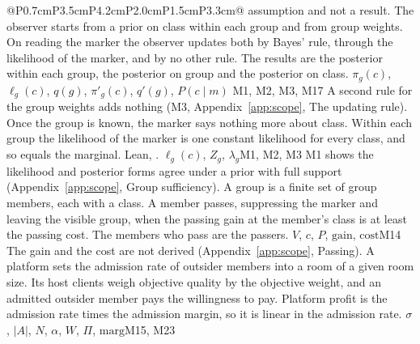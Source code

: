 \begin{longtable}{@{}P{0.7cm}P{3.5cm}P{4.2cm}P{2.0cm}P{1.5cm}P{3.3cm}@{}}
{  assumption and not a result.}
  {The observer starts from a prior on class within each group and from
  group weights. On reading the marker the observer updates both by Bayes'
  rule, through the likelihood of the marker, and by no other rule. The
  results are the posterior within each group, the posterior on group and
  the posterior on class.}
  {$\pi_g(c)$, $\ell_g(c)$, $q(g)$, $\pi'_g(c)$, $q'(g)$, $P(c\mid m)$}
  {M1, M2, M3, M17}
  {A second rule for the group weights adds nothing (M3,
  Appendix~\ref{app:scope}, The updating rule).}
  {Once the group is known, the marker says nothing more about class. Within
  each group the likelihood of the marker is one constant likelihood for
  every class, and so equals the marginal.
  Lean, .}
  {$\ell_g(c)$, $Z_g$, $\lambda_g$}{M1, M2, M3}
  {M1 shows the likelihood and posterior forms
  agree under a prior with full support (Appendix~\ref{app:scope}, Group
  sufficiency).}
  {A group is a finite set of group members, each with a class. A member
  passes, suppressing the marker and leaving the visible group, when the
  passing gain at the member's class is at least the passing cost. The
  members who pass are the passers.}
  {$V$, $c$, $P$, $\mathrm{gain}$, $\mathrm{cost}$}{M14}
  {The gain and the cost are not derived
  (Appendix~\ref{app:scope}, Passing).}
  {A platform sets the admission rate of outsider members into a room of a
  given room size. Its host clients weigh objective quality by the objective
  weight, and an admitted outsider member pays the willingness to pay.
  Platform profit is the admission rate times the admission margin, so it is
  linear in the admission rate.}
  {$\sigma$, $|A|$, $N$, $\alpha$, $W$, $\Pi$, $\mathrm{marg}$}{M15, M23}

\end{longtable}
